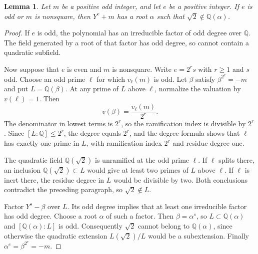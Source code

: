 \documentclass[11pt,a4paper]{article}
\newtheorem{lemma}[theorem]{Lemma}
\newcommand{\Q}{\mathbb Q}\newcommand{\Z}{\mathbb Z}
\begin{document}
\begin{lemma}\label{lem:rootfield}
Let $m$ be a positive odd integer, and let $e$ be a positive integer.
If $e$ is odd or $m$ is nonsquare, then $Y^e+m$ has a root $\alpha$
such that $\sqrt2\notin\Q(\alpha)$.
\end{lemma}
\begin{proof}
If $e$ is odd, the polynomial has an irreducible factor of odd degree
over $\Q$. The field generated by a root of that factor has odd degree,
so cannot contain a quadratic subfield.

Now suppose that $e$ is even and $m$ is nonsquare.
Write $e=2^r s$ with $r\ge1$ and $s$ odd. Choose an odd prime $\ell$
for which $v_\ell(m)$ is odd. Let $\beta$ satisfy
$\beta^{2^r}=-m$ and put $L=\Q(\beta)$. At any prime of $L$
above $\ell$, normalize the valuation by $v(\ell)=1$. Then
\[
                       v(\beta)=\frac{v_\ell(m)}{2^r}.
\]
The denominator in lowest terms is $2^r$, so the ramification index
is divisible by $2^r$. Since $[L:\Q]\le2^r$, the degree equals
$2^r$, and the degree formula shows that $\ell$ has exactly one
prime in $L$, with ramification index $2^r$ and residue degree one.

The quadratic field $\Q(\sqrt2)$ is unramified at the odd prime
$\ell$. If $\ell$ splits there, an inclusion $\Q(\sqrt2)\subset L$
would give at least two primes of $L$ above $\ell$. If $\ell$ is
inert there, the residue degree in $L$ would be divisible by two.
Both conclusions contradict the preceding paragraph, so
$\sqrt2\notin L$.

Factor $Y^s-\beta$ over $L$. Its odd degree implies that at least
one irreducible factor has odd degree. Choose a root $\alpha$ of
such a factor. Then $\beta=\alpha^s$, so $L\subset\Q(\alpha)$
and $[\Q(\alpha):L]$ is odd. Consequently $\sqrt2$ cannot belong
to $\Q(\alpha)$, since otherwise the quadratic extension
$L(\sqrt2)/L$ would be a subextension. Finally
$\alpha^e=\beta^{2^r}=-m$.
\end{proof}
\end{document}
